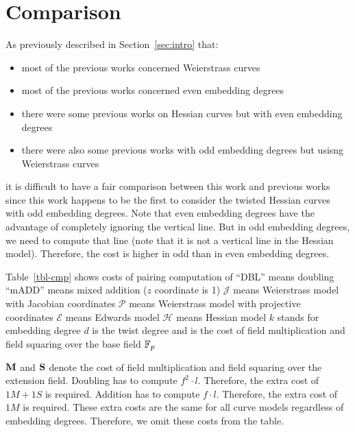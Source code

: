 \section{Comparison}

As previously described in Section~\ref{sec:intro} that:
\begin{itemize}
\item	most of the previous works concerned Weierstrass curves
\item	most of the previous works concerned even embedding degrees
\item	there were some previous works on Hessian curves but with even embedding degrees
\item	there were also some previous works with odd embedding degrees but usisng Weierstrass curves
\end{itemize}
it is difficult to have a fair comparison between this work and previous works
since this work happens to be the first to consider the twisted Hessian curves with odd embedding degrees.
Note that even embedding degrees have the advantage of completely ignoring the vertical line.
But in odd embedding degrees, we need to compute that line (note that it is not a vertical line in the Hessian model).
Therefore, the cost is higher in odd than in even embedding degrees.

Table~\ref{tbl-cmp} shows costs of pairing computation of 
``DBL'' means doubling
``mADD'' means mixed addition ($z$ coordinate is 1)
$\mathcal{J}$ means Weierstrass model with Jacobian coordinates
$\mathcal{P}$ means Weierstrass model with projective coordinates
$\mathcal{E}$ means Edwards model
$\mathcal{H}$ means Hessian model
$k$ stands for embedding degree
$d$ is the twist degree
\mul and \sqr is the cost of field multiplication and field squaring over the base field $\mathbb{F}_{p}$

$\textbf{M}$ and $\textbf{S}$ denote the cost of field multiplication and field squaring over the extension field.
Doubling has to compute $f^2 \cdot l$.
Therefore, the extra cost of $1M + 1S$ is required.
Addition has to compute $f \cdot l$.
Therefore, the extra cost of $1M$ is required.
These extra costs are the same for all curve models regardless of embedding degrees.
Therefore, we omit these costs from the table.

